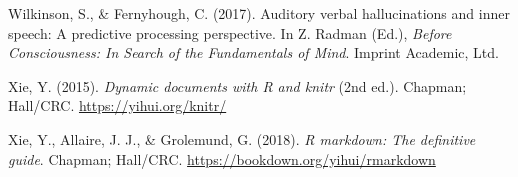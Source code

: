 \documentclass[
  english,
  man,floatsintext]{apa6}
\newlength{\cslhangindent}
\newenvironment{cslreferences}%
  {\setlength{\parindent}{0pt}%
  \everypar{\setlength{\hangindent}{\cslhangindent}}\ignorespaces}%
  {\par}
\begin{document}
\begin{cslreferences}
\leavevmode\hypertarget{ref-wilkinson_auditory_2017}{}%
Wilkinson, S., \& Fernyhough, C. (2017). Auditory verbal hallucinations and inner speech: A predictive processing perspective. In Z. Radman (Ed.), \emph{Before Consciousness: In Search of the Fundamentals of Mind}. Imprint Academic, Ltd.

\leavevmode\hypertarget{ref-R-knitr}{}%
Xie, Y. (2015). \emph{Dynamic documents with R and knitr} (2nd ed.). Chapman; Hall/CRC. \url{https://yihui.org/knitr/}

\leavevmode\hypertarget{ref-R-rmarkdown}{}%
Xie, Y., Allaire, J. J., \& Grolemund, G. (2018). \emph{R markdown: The definitive guide}. Chapman; Hall/CRC. \url{https://bookdown.org/yihui/rmarkdown}
\end{cslreferences}
\end{document}
